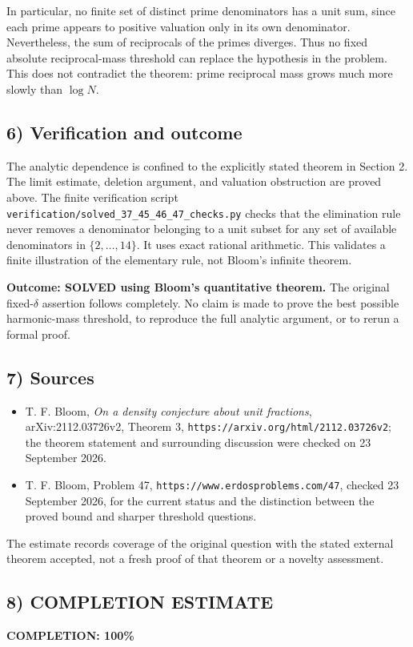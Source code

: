 In particular, no finite set of distinct prime denominators has a unit
sum, since each prime appears to positive valuation only in its own
denominator. Nevertheless, the sum of reciprocals of the primes
diverges. Thus no fixed absolute reciprocal-mass threshold can replace
the hypothesis in the problem. This does not contradict the theorem:
prime reciprocal mass grows much more slowly than $\log N$.

\subsection{6) Verification and outcome}
The analytic dependence is confined to the explicitly stated theorem
in Section 2. The limit estimate, deletion argument, and valuation
obstruction are proved above. The finite verification script
\texttt{verification/solved\_37\_45\_46\_47\_checks.py} checks that
the elimination rule never removes a denominator belonging to a unit
subset for any set of available denominators in $\{2,\ldots,14\}$.
It uses exact rational arithmetic. This validates a finite illustration
of the elementary rule, not Bloom's infinite theorem.

\textbf{Outcome: SOLVED using Bloom's quantitative theorem.}
The original fixed-$\delta$ assertion follows completely. No claim
is made to prove the best possible harmonic-mass threshold, to
reproduce the full analytic argument, or to rerun a formal proof.

\subsection{7) Sources}
\begin{itemize}
\item T. F. Bloom, \emph{On a density conjecture about unit fractions},
arXiv:2112.03726v2, Theorem 3,
\texttt{https://arxiv.org/html/2112.03726v2}; the theorem statement
and surrounding discussion were checked on 23 September 2026.
\item T. F. Bloom, Problem 47,
\texttt{https://www.erdosproblems.com/47}, checked 23 September 2026,
for the current status and the distinction between the proved bound
and sharper threshold questions.
\end{itemize}

The estimate records coverage of the original question with the stated
external theorem accepted, not a fresh proof of that theorem or a
novelty assessment.
\subsection{8) COMPLETION ESTIMATE}
\textbf{COMPLETION: 100\%}
